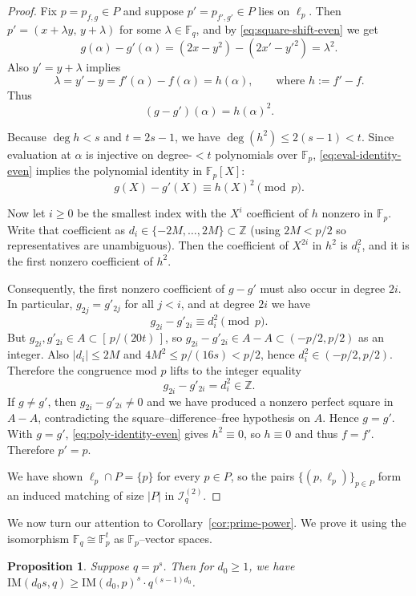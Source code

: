 \documentclass[12pt,reqno]{amsart}
\theoremstyle{plain}
\newtheorem{proposition}[theorem]{Proposition}
\theoremstyle{definition}
\newcommand{\F}{\mathbb{F}}
\newcommand{\Z}{\mathbb{Z}}
\newcommand{\IM}{\mathrm{IM}}
\newcommand{\II}{\mathcal{I}}
\newcommand{\1}{\mathbf{1}}
\begin{document}
\begin{proof}
Fix $p=p_{f,g}\in P$ and suppose $p'=p_{f',g'}\in P$ lies on $\ell_p$.
Then $p'=(x+\lambda y,\,y+\lambda)$ for some $\lambda\in\F_q$, and by \eqref{eq:square-shift-even} we get
\[
  g(\alpha)-g'(\alpha) = (2x-y^2)-(2x'-y'^2)=\lambda^2.
\]
Also $y'=y+\lambda$ implies
\[
  \lambda = y'-y = f'(\alpha)-f(\alpha)=h(\alpha),
  \qquad\text{where }h:=f'-f.
\]
Thus
\begin{equation}\label{eq:eval-identity-even}
  (g-g')(\alpha)=h(\alpha)^2.
\end{equation}

Because $\deg h < s$ and $t=2s-1$, we have $\deg(h^2)\le 2(s-1)<t$.
Since evaluation at $\alpha$ is injective on degree-$<t$ polynomials over $\F_p$,
\eqref{eq:eval-identity-even} implies the polynomial identity in $\F_p[X]$:
\begin{equation}\label{eq:poly-identity-even}
  g(X)-g'(X)\equiv h(X)^2 \pmod p.
\end{equation}

Now let $i\ge 0$ be the smallest index with the $X^i$ coefficient of $h$ nonzero in $\F_p$.
Write that coefficient as $d_i\in\{-2M,\dots,2M\}\subset\Z$ (using $2M<p/2$ so representatives are unambiguous).
Then the coefficient of $X^{2i}$ in $h^2$ is $d_i^2$, and it is the first nonzero coefficient of $h^2$.

Consequently, the first nonzero coefficient of $g-g'$ must also occur in degree $2i$.
In particular, $g_{2j}=g'_{2j}$ for all $j<i$, and at degree $2i$ we have
\[
  g_{2i}-g'_{2i}\equiv d_i^2 \pmod p.
\]
But $g_{2i},g'_{2i}\in A\subset[\,p/(20t)\,]$, so $g_{2i}-g'_{2i}\in A-A\subset(-p/2,p/2)$ as an integer.
Also $|d_i|\le 2M$ and $4M^2\le p/(16s)<p/2$, hence $d_i^2\in(-p/2,p/2)$.
Therefore the congruence mod $p$ lifts to the integer equality
\[
  g_{2i}-g'_{2i}=d_i^2\in\Z.
\]
If $g\neq g'$, then $g_{2i}-g'_{2i}\neq 0$ and we have produced a nonzero perfect square in $A-A$,
contradicting the square--difference--free hypothesis on $A$.
Hence $g=g'$. With $g=g'$, \eqref{eq:poly-identity-even} gives $h^2\equiv 0$, so $h\equiv 0$ and thus $f=f'$.
Therefore $p'=p$.

We have shown $\ell_p\cap P=\{p\}$ for every $p\in P$, so the pairs $\{(p,\ell_p)\}_{p\in P}$
form an induced matching of size $|P|$ in $\II_q^{(2)}$.
\end{proof}
We now turn our attention to Corollary~\ref{cor:prime-power}. We prove it using the isomorphism $\F_q \cong \F_p^t$ as $\F_p$--vector spaces.
\begin{proposition}
    \label{prop:prime-to-prime-power}
    Suppose $q=p^s$. Then for $d_0\ge 1$, we have $\IM(d_0 s,q)\ge \IM(d_0,p)^{s} \cdot q^{(s - 1)d_0}$.
\end{proposition}
\end{document}
